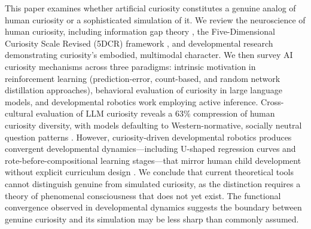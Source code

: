 This paper examines whether artificial curiosity constitutes a genuine analog of human curiosity or a sophisticated simulation of it. We review the neuroscience of human curiosity, including information gap theory \citep{loewenstein1994}, the Five-Dimensional Curiosity Scale Revised (5DCR) framework \citep{kashdan2018}, and developmental research demonstrating curiosity's embodied, multimodal character. We then survey AI curiosity mechanisms across three paradigms: intrinsic motivation in reinforcement learning (prediction-error, count-based, and random network distillation approaches), behavioral evaluation of curiosity in large language models, and developmental robotics work employing active inference. Cross-cultural evaluation of LLM curiosity reveals a 63\% compression of human curiosity diversity, with models defaulting to Western-normative, socially neutral question patterns \citep{borah2025}. However, curiosity-driven developmental robotics produces convergent developmental dynamics---including U-shaped regression curves and rote-before-compositional learning stages---that mirror human child development without explicit curriculum design \citep{tinker2025}. We conclude that current theoretical tools cannot distinguish genuine from simulated curiosity, as the distinction requires a theory of phenomenal consciousness that does not yet exist. The functional convergence observed in developmental dynamics suggests the boundary between genuine curiosity and its simulation may be less sharp than commonly assumed.

